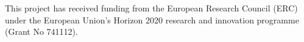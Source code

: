 \documentclass[hess, manuscript]{copernicus}
\begin{document}
\begin{acknowledgements}
This project has received funding from the European Research Council (ERC) under the European Union’s Horizon 2020 research and innovation programme (Grant No 741112).

\end{acknowledgements}






%
%
%

 
 









\end{document}
